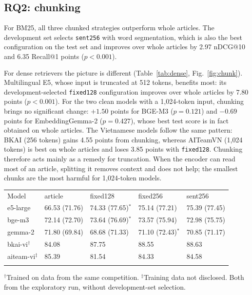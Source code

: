 \documentclass{ws-vjcs}
\begin{document}
\subsection{RQ2: chunking}

For BM25, all three chunked strategies outperform whole articles. The development set selects \texttt{sent256} with word segmentation, which is also the best configuration on the test set and improves over whole articles by 2.97 nDCG@10 and 6.35 Recall@1 points ($p < 0.001$).

For dense retrievers the picture is different (Table~\ref{tab:dense}, Fig.~\ref{fig:chunk}). Multilingual E5, whose input is truncated at 512 tokens, benefits most: its development-selected \texttt{fixed128} configuration improves over whole articles by 7.80 points ($p < 0.001$). For the two clean models with a 1,024-token input, chunking brings no significant change: $+1.50$ points for BGE-M3 ($p = 0.121$) and $-0.69$ points for EmbeddingGemma-2 ($p = 0.427$), whose best test score is in fact obtained on whole articles. The Vietnamese models follow the same pattern: BKAI (256 tokens) gains 4.55 points from chunking, whereas AITeamVN (1,024 tokens) is best on whole articles and loses 3.85 points with \texttt{fixed128}. Chunking therefore acts mainly as a remedy for truncation. When the encoder can read most of an article, splitting it removes context and does not help; the smallest chunks are the most harmful for 1,024-token models.

\begin{table}[t]
{\begin{tabular}{@{}lllll@{}} \toprule
Model & article & fixed128 & fixed256 & sent256 \\ \colrule
e5-large & 66.53 (71.76) & 74.33 (77.65)$^*$ & 75.14 (77.21) & 75.39 (77.45) \\
bge-m3 & 72.14 (72.70) & 73.64 (76.69)$^*$ & 73.57 (75.94) & 72.98 (75.75) \\
gemma-2 & 71.80 (69.84) & 68.68 (71.33) & 71.10 (72.43)$^*$ & 70.85 (71.17) \\ \colrule
bkai-vi$^\dagger$ & 84.08 & 87.75 & 88.55 & 88.63 \\
aiteam-vi$^\ddagger$ & 85.39 & 81.54 & 84.33 & 84.58 \\ \botrule
\end{tabular}}
\begin{tabnote}
$^\dagger$Trained on data from the same competition. $^\ddagger$Training data not disclosed. Both from the exploratory run, without development-set selection.
\end{tabnote}
\end{table}
\end{document}
